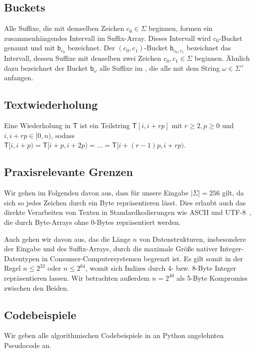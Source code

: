 \subsection{Buckets}
\label{def:bucket}
Alle Suffixe, die mit demselben Zeichen $c_0 \in \Sigma$ beginnen, formen ein zusammenhängendes Intervall im Suffix-Array.
Dieses Intervall wird $c_0$-Bucket genannt und mit $\mathsf b_{c_0}$ bezeichnet.
Der $(c_0,c_1)$-Bucket $\mathsf b_{c_0, c_1}$ bezeichnet das Intervall, dessen Suffixe mit denselben zwei Zeichen $c_0, c_1 \in \Sigma$ beginnen.
Ähnlich dazu bezeichnet der Bucket $\mathsf b_\omega$ alle Suffixe im \sa, die alle mit dem String $\omega \in \Sigma^+$ anfangen.

\subsection{Textwiederholung}
\label{def:repetition}
Eine Wiederholung in $\mathsf{T}$ ist ein Teilstring $\mathsf{T}[i, i + rp]$ mit $ r \geq 2, p \geq 0$ und $i, i + rp \in [0, n)$, sodass $\mathsf{T}[i, i+p) = \mathsf{T}[i + p, i + 2p) = \dots = \mathsf{T}[i + (r-1)p, i + rp)$.

\subsection{Praxisrelevante Grenzen}

Wir gehen im Folgenden davon aus, dass für unsere Eingabe $|\Sigma| = 256$ gilt, da sich so jedes Zeichen durch ein Byte repräsentieren lässt. Dies erlaubt auch das direkte Verarbeiten von Texten in Standardkodierungen wie ASCII und UTF-8~\cite{grundlagen:utf8}, die durch Byte-Arrays ohne 0-Bytes repräsentiert werden.

Auch gehen wir davon aus, das die Länge $n$ von Datenstrukturen, insbesondere der Eingabe und des Suffix-Arrays, durch die maximale Größe nativer Integer-Datentypen in Consumer-Computersystemen begrenzt ist. Es gilt somit in der Regel $n \leq 2^{32}$ oder $n \leq 2^{64}$, womit sich Indizes durch 4- bzw. 8-Byte Integer repräsentieren lassen. Wir betrachten außerdem $n = 2^{40}$ als 5-Byte Kompromiss zwischen den Beiden.

\subsection{Codebeispiele}

Wir geben alle algorithmischen Codebeispiele in an Python angelehnten Pseudocode an. 